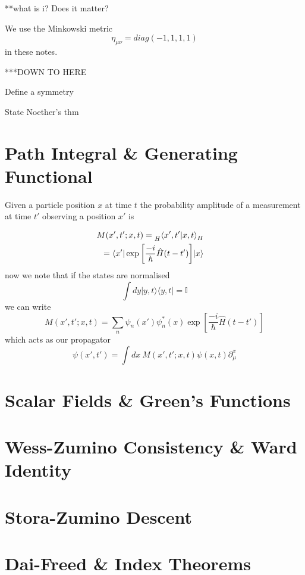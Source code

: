 \documentclass{article}
\theoremstyle{definition}
\theoremstyle{plain}
\begin{document}
**what is i? Does it matter?

We use the Minkowski metric 
\[ \eta_{\mu \nu} = diag(-1,1,1,1) \]
in these notes.

***DOWN TO HERE 

Define a symmetry

State Noether's thm



\section{Path Integral \& Generating Functional}
Given a particle position $x$ at time $t$ the probability amplitude of
a measurement at time $t'$ observing a position $x'$ is

\begin{align*}
  \begin{split}
  M(x', t'; x, t) &= \prescript{}{H}{\braket{x',t'|x, t}_{H}}
  \end{split} \\
  \begin{split}
  &= \braket{x'|\exp{\left[\frac{-i}{\hbar}\hat{H}(t-t')\right]}|x}
  \end{split}
\end{align*}\label{eq:1}
now we note that if the states are normalised
\begin{equation}
  \int{dy |y,t\rangle{} \langle{y,t|} } = \mathbb{I}
\end{equation}
we can write 
  \begin{equation}
    M(x', t'; x, t) = \sum_{n}{\psi_{n}(x')\psi_{n}^*(x)\exp{\left[\frac{-i}{\hbar}\hat{H}(t-t')\right]}}
  \end{equation}
which acts as our propagator
\begin{equation}
 \psi(x', t') = \int{dx \ M(x', t'; x, t) \psi(x, t)}
 \partial^{x}_{\mu}
\end{equation}


\section{Scalar Fields \& Green's Functions}
\section{Wess-Zumino Consistency \& Ward Identity}
\section{Stora-Zumino Descent}
\section{Dai-Freed \& Index Theorems}

\newpage


\end{document}
